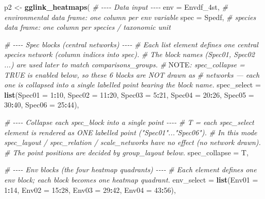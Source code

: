 \documentclass[
]{book}
\newenvironment{Shaded}{\begin{snugshade}}{\end{snugshade}}
\newcommand{\AlertTok}[1]{\textcolor[rgb]{0.94,0.16,0.16}{#1}}
\newcommand{\AttributeTok}[1]{\textcolor[rgb]{0.13,0.29,0.53}{#1}}
\newcommand{\CommentTok}[1]{\textcolor[rgb]{0.56,0.35,0.01}{\textit{#1}}}
\newcommand{\DecValTok}[1]{\textcolor[rgb]{0.00,0.00,0.81}{#1}}
\newcommand{\FunctionTok}[1]{\textcolor[rgb]{0.13,0.29,0.53}{\textbf{#1}}}
\newcommand{\NormalTok}[1]{#1}
\newcommand{\OtherTok}[1]{\textcolor[rgb]{0.56,0.35,0.01}{#1}}
\newcommand{\SpecialCharTok}[1]{\textcolor[rgb]{0.81,0.36,0.00}{\textbf{#1}}}
\begin{document}
\begin{Shaded}
\begin{Highlighting}[]
\NormalTok{p2 }\OtherTok{\textless{}{-}} \FunctionTok{gglink\_heatmaps}\NormalTok{(}
  \CommentTok{\# {-}{-}{-}{-} Data input {-}{-}{-}{-}}
  \AttributeTok{env                =}\NormalTok{ Envdf\_4st,            }\CommentTok{\# environmental data frame: one column per env variable}
  \AttributeTok{spec               =}\NormalTok{ Spedf,                }\CommentTok{\# species data frame: one column per species / taxonomic unit}

  \CommentTok{\# {-}{-}{-}{-} Spec blocks (central networks) {-}{-}{-}{-}}
  \CommentTok{\# Each list element defines one central species network (column indices into \textasciigrave{}spec\textasciigrave{}).}
  \CommentTok{\# The block names (Spec01, Spec02 ...) are used later to match \textasciigrave{}comparisons\_groups\textasciigrave{}.}
  \CommentTok{\# }\AlertTok{NOTE}\CommentTok{: spec\_collapse = TRUE is enabled below, so these 6 blocks are NOT drawn as}
  \CommentTok{\#       networks — each one is collapsed into a single labelled point bearing the block name.}
  \AttributeTok{spec\_select        =} \FunctionTok{list}\NormalTok{(}\AttributeTok{Spec01 =} \DecValTok{1}\SpecialCharTok{:}\DecValTok{10}\NormalTok{,}
                            \AttributeTok{Spec02 =} \DecValTok{11}\SpecialCharTok{:}\DecValTok{20}\NormalTok{,}
                            \AttributeTok{Spec03 =} \DecValTok{5}\SpecialCharTok{:}\DecValTok{21}\NormalTok{,}
                            \AttributeTok{Spec04 =} \DecValTok{20}\SpecialCharTok{:}\DecValTok{26}\NormalTok{,}
                            \AttributeTok{Spec05 =} \DecValTok{30}\SpecialCharTok{:}\DecValTok{40}\NormalTok{,}
                            \AttributeTok{Spec06 =} \DecValTok{25}\SpecialCharTok{:}\DecValTok{44}\NormalTok{),}

  \CommentTok{\# {-}{-}{-}{-} Collapse each spec\_block into a single point {-}{-}{-}{-}}
  \CommentTok{\# T = each spec\_select element is rendered as ONE labelled point ("Spec01"..."Spec06").}
  \CommentTok{\# In this mode spec\_layout / spec\_relation / scale\_networks have no effect (no network drawn).}
  \CommentTok{\# The point positions are decided by \textasciigrave{}group\_layout\textasciigrave{} below.}
  \AttributeTok{spec\_collapse      =}\NormalTok{ T,}

  \CommentTok{\# {-}{-}{-}{-} Env blocks (the four heatmap quadrants) {-}{-}{-}{-}}
  \CommentTok{\# Each element defines one env block; each block becomes one heatmap quadrant.}
  \AttributeTok{env\_select         =} \FunctionTok{list}\NormalTok{(}\AttributeTok{Env01 =} \DecValTok{1}\SpecialCharTok{:}\DecValTok{14}\NormalTok{,}
                            \AttributeTok{Env02 =} \DecValTok{15}\SpecialCharTok{:}\DecValTok{28}\NormalTok{,}
                            \AttributeTok{Env03 =} \DecValTok{29}\SpecialCharTok{:}\DecValTok{42}\NormalTok{,}
                            \AttributeTok{Env04 =} \DecValTok{43}\SpecialCharTok{:}\DecValTok{56}\NormalTok{),}


\end{Highlighting}
\end{Shaded}
\end{document}
